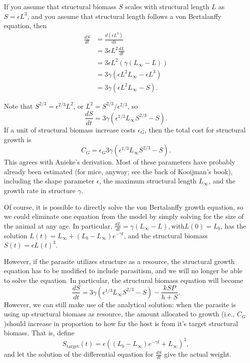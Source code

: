 \documentclass[11pt,reqno,final,pdftex]{amsart}\usepackage[]{graphicx}\usepackage[]{color}
\theoremstyle{plain}
\numberwithin{equation}{part}
\begin{document}
If you assume that structural biomass $S$ scales with structural length $L$ as $S =\epsilon L^3$, and you assume that structural length
follows a von Bertalanffy equation, then
\begin{align}
\frac{dS}{dt} &=\frac{d\left(\epsilon  L^3\right)}{\text{dt}} \\
& =3\epsilon  L^2 \frac{dL}{dt} \\
& =3 \epsilon  L^2 \left(\gamma \left(L_{\infty}-L\right)\right) \\
& =3 \gamma \left(\epsilon  L^2 L_{\infty}-\epsilon  L^3\right) \\
& =3 \gamma \left(\epsilon  L^2L_{\infty }-S\right).
\end{align}

Note that $S^{2/3}=\epsilon ^{2/3}L^2$, or $L^2=S^{2/3}/\epsilon ^{2/3}$, so
\begin{equation}
\frac{dS}{dt}=3\gamma  \left(\epsilon ^{1/3}L_{\infty }S^{2/3}-S\right).
\end{equation}
If a unit of structural biomass increase costs $\epsilon _G$, then the total cost for structural growth is
\begin{equation}
C_G = \epsilon _G 3\gamma  \left(\epsilon ^{1/3}L_{\infty }S^{2/3}-S\right).
\end{equation}
This agrees with Anieke's derivation.
Most of these parameters have probably already been estimated (for mice, anyway; see the back of Kooijman's book), including the shape parameter $\epsilon$, the maximum structural length $L_{\infty }$, and the growth rate in structure $\gamma$.

Of course, it is possible to directly solve the von Bertalanffy growth equation, so we could eliminate one equation from the model by simply solving for the size of the animal at any age.
In particular, $\frac{dL}{dt}=\gamma \left(L_{\infty }-L\right), \text{with} L(0)=L_b$, has the solution $L(t)=L_{\infty }+\left(L_b-L_{\infty}\right)e^{-\gamma t}$, and the structural biomass $S(t)=\epsilon  L(t)^3$.

However, if the parasite utilizes structure as a resource, the structural growth equation has to be modified to include parasitism, and we will no longer be able to solve the equation.
In particular, the structural biomass equation will become
\begin{equation}
\frac{dS}{dt}=3\gamma  \left(\epsilon ^{1/3}L_{\infty }S^{2/3}-S\right)-\frac{k S P}{h+S}.
\end{equation}
However, we can still make use of the analytical solution: when the parasite is using up structural biomass as resource, the amount allocated to growth (i.e., $C_G$)should increase in proportion to how far the host is from it's target structural biomass.
That is, define
\begin{equation}
S_{\text{target}}(t)=\epsilon \left(\left(L_b-L_{\infty }\right) e^{-\gamma  t}+L_{\infty }\right)^3,
\end{equation} and let the solution of the differential equation for $\frac{dS}{dt}$ give the actual weight.
\end{document}
